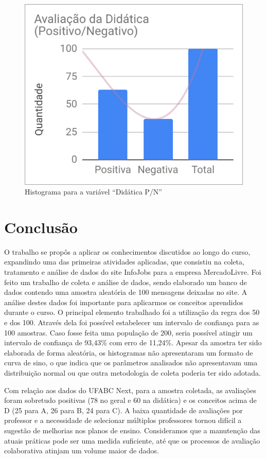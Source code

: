 	\begin{figure}[H]
		\centering
		\caption{Histograma para a variável ``Didática P/N''}
		\label{fig:recomendacao}
		\includegraphics[width=0.5\linewidth]{img/ufabc_didatica}
	\end{figure}

	\chapter{Conclusão} \label{sec:conclusao}
	
	O trabalho se propôs a aplicar os conhecimentos discutidos ao longo do curso, expandindo uma das primeiras atividades aplicadas, que consistiu na coleta, tratamento e análise de dados do site InfoJobs para a empresa MercadoLivre. Foi feito um trabalho de coleta e análise de dados, sendo elaborado um banco de dados contendo uma amostra aleatória de 100 mensagens deixadas no site. A análise destes dados foi importante para aplicarmos os conceitos aprendidos durante o curso. O principal elemento trabalhado foi a utilização da regra dos 50 e dos 100. Através dela foi possível estabelecer um intervalo de confiança para as 100 amostras. Caso fosse feita uma população de 200, seria possível atingir um intervalo de confiança de 93,43\% com erro de 11,24\%. Apesar da amostra ter sido elaborada de forma aleatória, os histogramas não apresentaram um formato de curva de sino, o que indica que os parâmetros analisados não apresentavam uma distribuição normal ou que outra metodologia de coleta poderia ter sido adotada.
	
	Com relação aos dados do UFABC Next, para a amostra coletada, as avaliações foram sobretudo positivas (78 no geral e 60 na didática) e os conceitos acima de D (25 para A, 26 para B, 24 para C). A baixa quantidade de avaliações por professor e a necessidade de selecionar múltiplos professores tornou difícil a sugestão de melhorias nos planos de ensino. Consideramos que a manutenção das atuais práticas pode ser uma medida suficiente, até que os processos de avaliação colaborativa atinjam um volume maior de dados.

